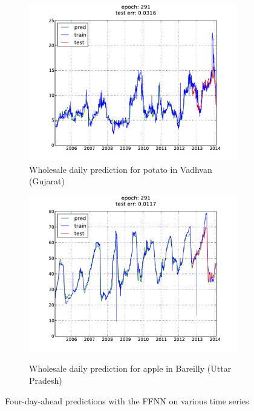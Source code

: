 \begin{figure}[H]
    \centering
        \begin{subfigure}[b]{.45\linewidth}
        \centering
        \includegraphics[width=\textwidth]{img/ffnn/1.pdf}
        \caption{Wholesale daily prediction for potato in Vadhvan (Gujarat)}
        \label{subfig:ffnn_pred_1}
        \end{subfigure}
        \quad
        \begin{subfigure}[b]{.45\linewidth}
        \centering
        \includegraphics[width=\textwidth]{img/ffnn/2.pdf}
        \label{subfig:ffnn_pred_2}
        \caption{Wholesale daily prediction for apple in Bareilly (Uttar Pradesh)}
        \end{subfigure}
    \caption{Four-day-ahead predictions with the FFNN on various time series}
\end{figure}

